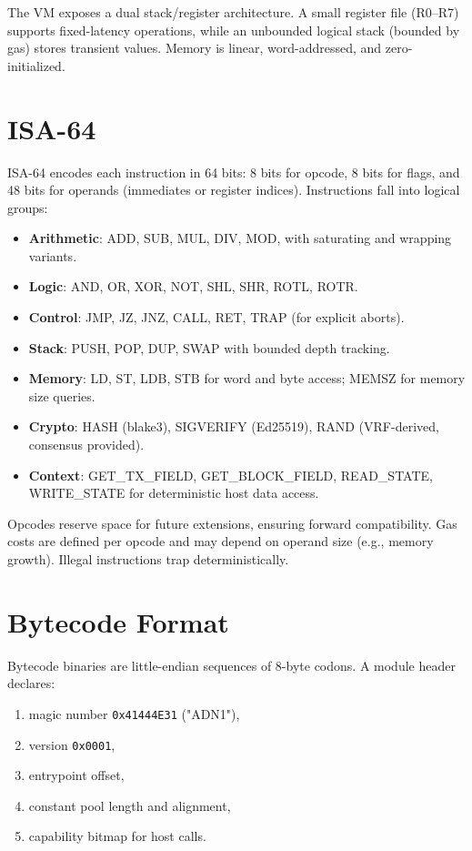 \documentclass[11pt]{article}
\begin{document}
The VM exposes a dual stack/register architecture. A small register file (R0--R7) supports fixed-latency operations, while an unbounded logical stack (bounded by gas) stores transient values. Memory is linear, word-addressed, and zero-initialized.

\section{ISA-64}
ISA-64 encodes each instruction in 64 bits: 8 bits for opcode, 8 bits for flags, and 48 bits for operands (immediates or register indices). Instructions fall into logical groups:
\begin{itemize}[noitemsep]
  \item \textbf{Arithmetic}: ADD, SUB, MUL, DIV, MOD, with saturating and wrapping variants.
  \item \textbf{Logic}: AND, OR, XOR, NOT, SHL, SHR, ROTL, ROTR.
  \item \textbf{Control}: JMP, JZ, JNZ, CALL, RET, TRAP (for explicit aborts).
  \item \textbf{Stack}: PUSH, POP, DUP, SWAP with bounded depth tracking.
  \item \textbf{Memory}: LD, ST, LDB, STB for word and byte access; MEMSZ for memory size queries.
  \item \textbf{Crypto}: HASH (blake3), SIGVERIFY (Ed25519), RAND (VRF-derived, consensus provided).
  \item \textbf{Context}: GET_TX_FIELD, GET_BLOCK_FIELD, READ_STATE, WRITE_STATE for deterministic host data access.
\end{itemize}

Opcodes reserve space for future extensions, ensuring forward compatibility. Gas costs are defined per opcode and may depend on operand size (e.g., memory growth). Illegal instructions trap deterministically.

\section{Bytecode Format}
Bytecode binaries are little-endian sequences of 8-byte codons. A module header declares:
\begin{enumerate}[noitemsep]
  \item magic number \texttt{0x41444E31} ("ADN1"),
  \item version \texttt{0x0001},
  \item entrypoint offset,
  \item constant pool length and alignment,
  \item capability bitmap for host calls.
\end{enumerate}
\end{document}
